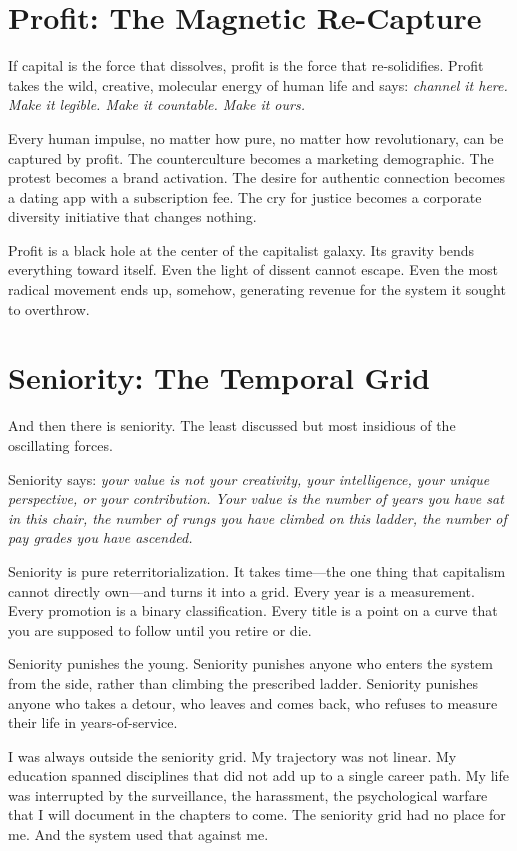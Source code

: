 \documentclass[11pt,openany]{book}
\begin{document}
\section*{Profit: The Magnetic Re-Capture}

If capital is the force that dissolves, profit is the force that re-solidifies. Profit takes the wild, creative, molecular energy of human life and says: \textit{channel it here. Make it legible. Make it countable. Make it ours.}

Every human impulse, no matter how pure, no matter how revolutionary, can be captured by profit. The counterculture becomes a marketing demographic. The protest becomes a brand activation. The desire for authentic connection becomes a dating app with a subscription fee. The cry for justice becomes a corporate diversity initiative that changes nothing.

Profit is a black hole at the center of the capitalist galaxy. Its gravity bends everything toward itself. Even the light of dissent cannot escape. Even the most radical movement ends up, somehow, generating revenue for the system it sought to overthrow.

\section*{Seniority: The Temporal Grid}

And then there is seniority. The least discussed but most insidious of the oscillating forces.

Seniority says: \textit{your value is not your creativity, your intelligence, your unique perspective, or your contribution. Your value is the number of years you have sat in this chair, the number of rungs you have climbed on this ladder, the number of pay grades you have ascended.}

Seniority is pure reterritorialization. It takes time---the one thing that capitalism cannot directly own---and turns it into a grid. Every year is a measurement. Every promotion is a binary classification. Every title is a point on a curve that you are supposed to follow until you retire or die.

Seniority punishes the young. Seniority punishes anyone who enters the system from the side, rather than climbing the prescribed ladder. Seniority punishes anyone who takes a detour, who leaves and comes back, who refuses to measure their life in years-of-service.

I was always outside the seniority grid. My trajectory was not linear. My education spanned disciplines that did not add up to a single career path. My life was interrupted by the surveillance, the harassment, the psychological warfare that I will document in the chapters to come. The seniority grid had no place for me. And the system used that against me.
\end{document}
